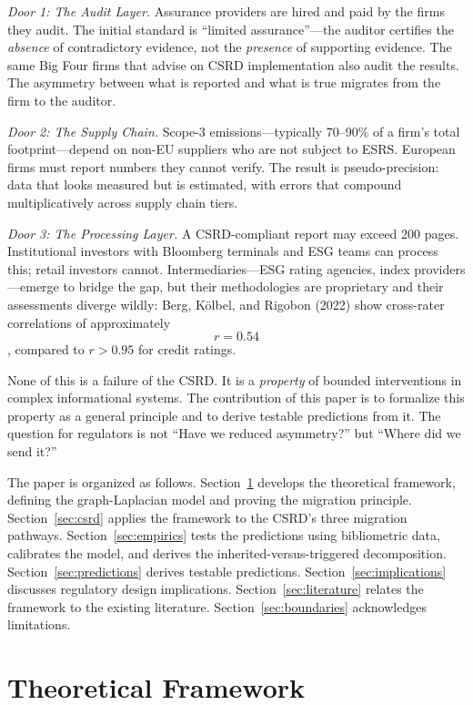 \documentclass[12pt,a4paper]{article}
\begin{document}
\textit{Door 1: The Audit Layer.} Assurance providers are hired and paid by the firms they audit. The initial standard is ``limited assurance''---the auditor certifies the \textit{absence} of contradictory evidence, not the \textit{presence} of supporting evidence. The same Big Four firms that advise on CSRD implementation also audit the results. The asymmetry between what is reported and what is true migrates from the firm to the auditor.

\textit{Door 2: The Supply Chain.} Scope-3 emissions---typically 70--90\% of a firm's total footprint---depend on non-EU suppliers who are not subject to ESRS. European firms must report numbers they cannot verify. The result is pseudo-precision: data that looks measured but is estimated, with errors that compound multiplicatively across supply chain tiers.

\textit{Door 3: The Processing Layer.} A CSRD-compliant report may exceed 200 pages. Institutional investors with Bloomberg terminals and ESG teams can process this; retail investors cannot. Intermediaries---ESG rating agencies, index providers---emerge to bridge the gap, but their methodologies are proprietary and their assessments diverge wildly: Berg, K\"olbel, and Rigobon (2022) show cross-rater correlations of approximately $$r = 0.54$$, compared to $r > 0.95$ for credit ratings.

None of this is a failure of the CSRD. It is a \textit{property} of bounded interventions in complex informational systems. The contribution of this paper is to formalize this property as a general principle and to derive testable predictions from it. The question for regulators is not ``Have we reduced asymmetry?'' but ``Where did we send it?''

The paper is organized as follows. Section~\ref{sec:theory} develops the theoretical framework, defining the graph-Laplacian model and proving the migration principle. Section~\ref{sec:csrd} applies the framework to the CSRD's three migration pathways. Section~\ref{sec:empirics} tests the predictions using bibliometric data, calibrates the model, and derives the inherited-versus-triggered decomposition. Section~\ref{sec:predictions} derives testable predictions. Section~\ref{sec:implications} discusses regulatory design implications. Section~\ref{sec:literature} relates the framework to the existing literature. Section~\ref{sec:boundaries} acknowledges limitations.


\section{Theoretical Framework}
\label{sec:theory}
\end{document}
